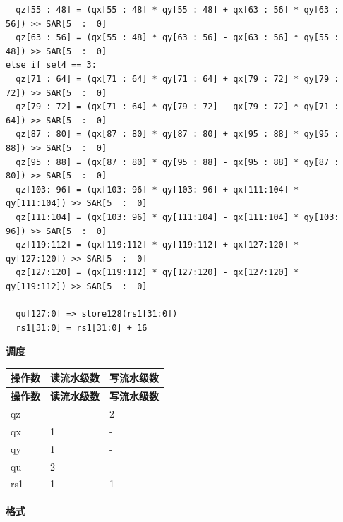 \begin{lstlisting}
  qz[55 : 48] = (qx[55 : 48] * qy[55 : 48] + qx[63 : 56] * qy[63 : 56]) >> SAR[5  :  0]
  qz[63 : 56] = (qx[55 : 48] * qy[63 : 56] - qx[63 : 56] * qy[55 : 48]) >> SAR[5  :  0]
else if sel4 == 3:
  qz[71 : 64] = (qx[71 : 64] * qy[71 : 64] + qx[79 : 72] * qy[79 : 72]) >> SAR[5  :  0]
  qz[79 : 72] = (qx[71 : 64] * qy[79 : 72] - qx[79 : 72] * qy[71 : 64]) >> SAR[5  :  0]
  qz[87 : 80] = (qx[87 : 80] * qy[87 : 80] + qx[95 : 88] * qy[95 : 88]) >> SAR[5  :  0]
  qz[95 : 88] = (qx[87 : 80] * qy[95 : 88] - qx[95 : 88] * qy[87 : 80]) >> SAR[5  :  0]
  qz[103: 96] = (qx[103: 96] * qy[103: 96] + qx[111:104] * qy[111:104]) >> SAR[5  :  0]
  qz[111:104] = (qx[103: 96] * qy[111:104] - qx[111:104] * qy[103: 96]) >> SAR[5  :  0]
  qz[119:112] = (qx[119:112] * qy[119:112] + qx[127:120] * qy[127:120]) >> SAR[5  :  0]
  qz[127:120] = (qx[119:112] * qy[127:120] - qx[127:120] * qy[119:112]) >> SAR[5  :  0]

  qu[127:0] => store128(rs1[31:0])
  rs1[31:0] = rs1[31:0] + 16
\end{lstlisting}

\textbf{调度}\\
\begin{longtable}[c]{|l|l|l|}
    \hline
    \rowcolor{lightgray}
    \textbf{操作数} & \textbf{读流水级数} & \textbf{写流水级数} \\\hline
    \endfirsthead
    \hline
    \rowcolor{lightgray}
     \textbf{操作数} & \textbf{读流水级数} & \textbf{写流水级数} \\\hline
    \endhead
    \hline
    \endfoot


    qz & - & 2 \\\hline
     qx & 1 & - \\\hline
     qy & 1 & - \\\hline
     qu & 2 & - \\\hline
     rs1 & 1 & 1

\end{longtable}

\textbf{格式}\\

